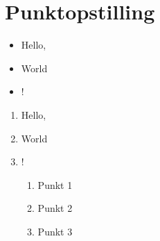\chapter{Punktopstilling}

\begin{itemize}[label=$\star$]
\item Hello,
\item World
\item !
\end{itemize}

\begin{enumerate}
\item Hello,
\item World
\item !
\begin{enumerate}
\item Punkt 1
\item Punkt 2
\item Punkt 3
\end{enumerate}
\end{enumerate}



